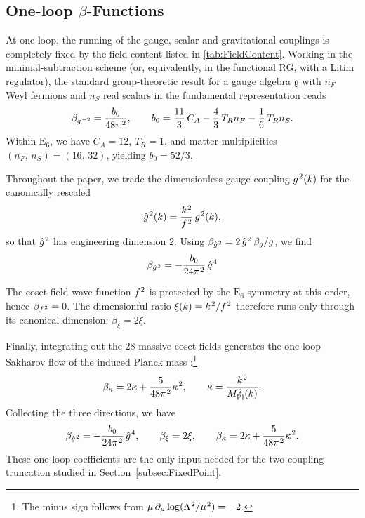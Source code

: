\documentclass[pdflatex,sn-mathphys-num]{sn-jnl}
\theoremstyle{thmstyleone}
\theoremstyle{thmstyletwo}%
\theoremstyle{thmstylethree}%
\newcommand{\E}[1]{\mathrm{E_{#1}}}
\newcommand{\ESix}{\E{6}}
\newcommand{\sm}{\hspace{.065em}}
\newcommand{\subsecref}[1]{\hyperref[#1]{Section~\ref*{#1}}}
\newcommand{\smexp}[1]{^{\sm #1}}
\begin{document}
\subsection{One-loop \texorpdfstring{$\beta$}{Beta}-Functions}
\label{subsec:BetaOne}

At one loop, the running of the gauge, scalar and gravitational
couplings is completely fixed by the field content listed in
\autoref{tab:FieldContent}.  Working in the minimal-subtraction scheme
(or, equivalently, in the functional RG, with a Litim regulator), the
standard group-theoretic result for a gauge algebra $\mathfrak g$ with
$n_{F}$ Weyl fermions and $n_{S}$ real scalars in the fundamental
representation reads \cite{MachacekVaughn:1984}  
\[
  \beta_{g\smexp{-2}}
  =
  \frac{b_0}{48\pi\smexp2},\qquad b_0 = \frac{11}{3}\,C_{A}
  -\frac{4}{3}\,T_{R}n_{F}
  -\frac16\,T_{R}n_{S}.
\]
Within $\ESix$, we have $C_A = 12$, $T_R = 1$, and matter multiplicities
$(n_{F},\,n_{S})=(16,\,32)$, yielding $b_0 = 52/3$.

Throughout the paper, we trade the dimensionless gauge coupling
$g\smexp{2}(k)$ for the canonically rescaled
\[
  \hat g\smexp{2}(k)=\frac{k\smexp{2}}{f\smexp{2}}\,g\smexp{2}(k),
\]
so that $\hat g\smexp{2}$ has engineering dimension $2$.
Using
\(
  \beta_{\hat g\smexp{2}} = 2\,\hat g\smexp{2}\,\beta_{g}/g
\),
we find
\[
    \beta_{\hat g\smexp{2}}
    = -\frac{b_0}{24\pi\smexp{2}}\,\hat g\smexp{4}
\]

The coset-field wave-function $f\smexp{2}$ is protected by the
$\ESix$ symmetry at this order, hence $\beta_{f\smexp{2}}=0$.
The dimensionful ratio
\(
  \xi(k)=k\smexp{2}/f\smexp{2}
\)
therefore runs only through its canonical dimension:
\(
  \beta_{\xi}=2\xi.
\)

Finally, integrating out the $28$ massive coset fields generates the
one-loop Sakharov flow of the induced Planck mass
\cite{SakharovInducedGravity,AdlerInducedGravity}:\footnote{%
  The minus sign follows from
  $\mu\,\partial_{\mu}\log(\Lambda\smexp{2}/\mu\smexp{2})=-2$.}
\[
  \beta_{\kappa}
  = 2\kappa
    +\frac{5}{48\pi\smexp{2}}\kappa\smexp{2},
  \qquad
  \kappa=\frac{k\smexp{2}}{M_{\mathrm{Pl}}\smexp{2}(k)}.
\]
Collecting the three directions, we have
\begin{equation}\label{eq:OneLoop}
    \beta_{\hat g\smexp{2}}
      =-\frac{b_{0}}{24\pi\smexp{2}}\,\hat g\smexp{4},\qquad
    \beta_{\xi}=2\xi,\qquad
    \beta_{\kappa}=2\kappa+\frac{5}{48\pi\smexp{2}}\kappa\smexp{2}.
\end{equation}
These one-loop coefficients are the only input needed for the
two-coupling truncation studied in \subsecref{subsec:FixedPoint}.
\end{document}
